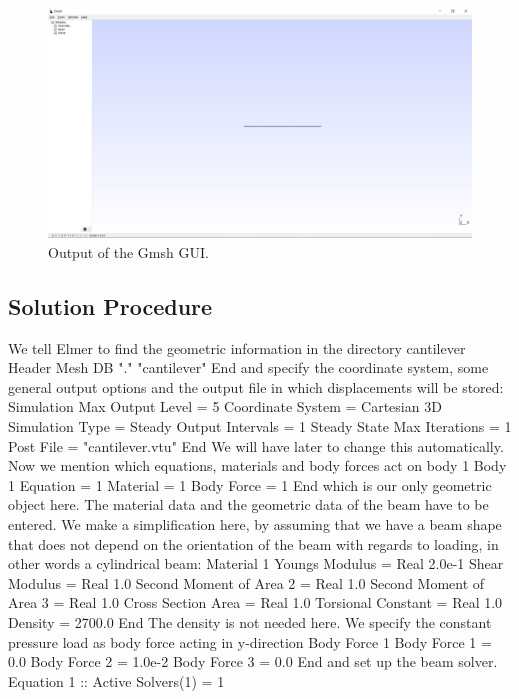 \begin{figure}[hbt]
  \centerline{\includegraphics[width=1.0\textwidth]{gmsh-GUI}}
  \caption{Output of the Gmsh GUI.} 
  \label{fig:timoshenko-gmsh-GUI}
\end{figure}

\subsection*{Solution Procedure}
We tell Elmer to find the geometric information in the directory cantilever  
\ttbegin
Header
  Mesh DB "." "cantilever"
End
\ttend
and specify the coordinate system, some general output options and the output file in which displacements will be stored:
\ttbegin
Simulation
  Max Output Level = 5
  Coordinate System = Cartesian 3D
  Simulation Type = Steady
  Output Intervals = 1
  Steady State Max Iterations = 1
  Post File = "cantilever.vtu"
End
\ttend 
We will have later to change this automatically. Now we mention which equations, materials and body forces act on body 1
\ttbegin
Body 1
  Equation = 1
  Material = 1
  Body Force = 1
End
\ttend 
which is our only geometric object here. The material data and the geometric data of the beam have to be entered. We make a simplification here, by assuming that we have a beam shape that does not depend on the orientation of the beam with regards to loading, in other words a cylindrical beam:
\ttbegin
Material 1
 Youngs Modulus = Real 2.0e-1
 Shear Modulus = Real 1.0
 Second Moment of Area 2 = Real 1.0
 Second Moment of Area 3 = Real 1.0
 Cross Section Area = Real 1.0
 Torsional Constant = Real 1.0
 Density = 2700.0
End
\ttend 
The density is not needed here.
We specify the constant pressure load as body force acting in y-direction
\ttbegin
Body Force 1
  Body Force 1 = 0.0
  Body Force 2 = 1.0e-2
  Body Force 3 = 0.0
End
\ttend 
and set up the beam solver.
\ttbegin
Equation 1 :: Active Solvers(1) = 1

